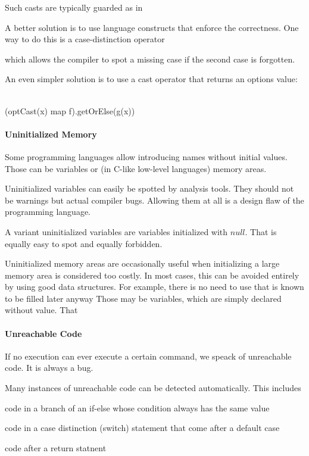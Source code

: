 Such casts are typically guarded as in
\begin{acode}
\end{acode}

A better solution is to use language constructs that enforce the correctness.
One way to do this is a case-distinction operator
\begin{acode}
\end{acode}
which allows the compiler to spot a missing case if the second case is forgotten.

An even simpler solution is to use a cast operator that returns an options value:
\begin{acode}
\\
(optCast(x)\; map\; f).getOrElse(g(x))
\end{acode}

\paragraph{Uninitialized Memory}
Some programming languages allow introducing names without initial values.
Those can be variables or (in C-like low-level languages) memory areas.

Uninitialized variables can easily be spotted by analysis tools.
They should not be warnings but actual compiler bugs.
Allowing them at all is a design flaw of the programming language.

A variant uninitialized variables are variables initialized with $null$.
That is equally easy to spot and equally forbidden.

Uninitialized memory areas are occasionally useful when initializing a large memory area is considered too costly.
In most cases, this can be avoided entirely by using good data structures.
For example, there is no need to use
 that is known to be filled later anyway Those may be variables, which are simply declared without value.
That

\paragraph{Unreachable Code}
If no execution can ever execute a certain command, we speack of unreachable code.
It is always a bug.

Many instances of unreachable code can be detected automatically.
This includes
\begin{compactitem}
  \item code in a branch of an if-else whose condition always has the same value
  \item code in a case distinction (switch) statement that come after a default case
  \item code after a return statnent
\end{compactitem}

